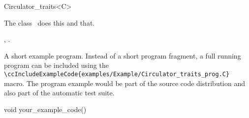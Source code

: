 

\begin{ccRefClass}{Circulator_traits<C>}  %


\ccDefinition
  
The class \ccRefName\ does this and that.


\ccIsModel


\ccTypes


\ccCreation
{}  %


\ccOperations


\ccSeeAlso

,
.

\ccExample

A short example program.
Instead of a short program fragment, a full running program can be
included using the 
\verb|\ccIncludeExampleCode{examples/Example/Circulator_traits_prog.C}| 
macro. The program example would be part of the source code distribution and
also part of the automatic test suite.

\begin{ccExampleCode}
void your_example_code() {
}
\end{ccExampleCode}


\end{ccRefClass}


